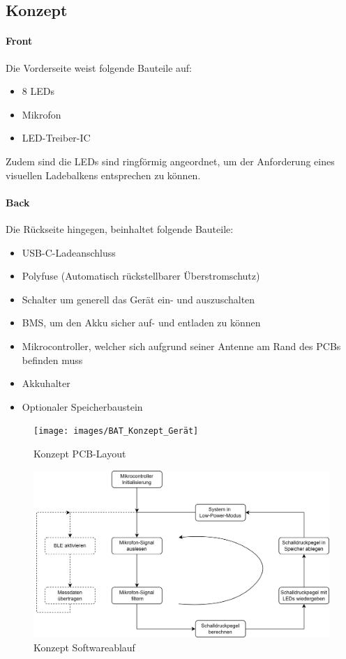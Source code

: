 \documentclass[12pt]{article}
\begin{document}
	\subsection{Konzept} \label{Konzept}
	\paragraph{Front}
	Die Vorderseite weist folgende Bauteile auf:
	\begin{itemize}
		\item 8 LEDs
		\item Mikrofon
		\item LED-Treiber-IC
	\end{itemize}
	Zudem sind die LEDs sind ringförmig angeordnet, um der Anforderung eines visuellen Ladebalkens entsprechen zu können.
	\paragraph{Back}
	Die Rückseite hingegen, beinhaltet folgende Bauteile:
	\begin{itemize}
		\item USB-C-Ladeanschluss
		\item Polyfuse (Automatisch rückstellbarer Überstromschutz)
		\item Schalter um generell das Gerät ein- und auszuschalten
		\item BMS, um den Akku sicher auf- und entladen zu können
		\item Mikrocontroller, welcher sich aufgrund seiner Antenne am Rand des PCBs befinden muss
		\item Akkuhalter
		\item Optionaler Speicherbaustein
	\end{itemize}
	\begin{figure}[H]
		\centering
		\texttt{[image: images/BAT\_Konzept\_Gerät]}
		\caption{Konzept PCB-Layout}
		\label{fig:batkonzeptgerat}
	\end{figure}
	\begin{figure}[H]
		\centering
		\includegraphics[width=1\linewidth]{images/BAT_Konzept_Softwareablauf}
		\caption{Konzept Softwareablauf}
		\label{fig:batkonzeptsoftwareablauf}
	\end{figure}
	
\end{document}
